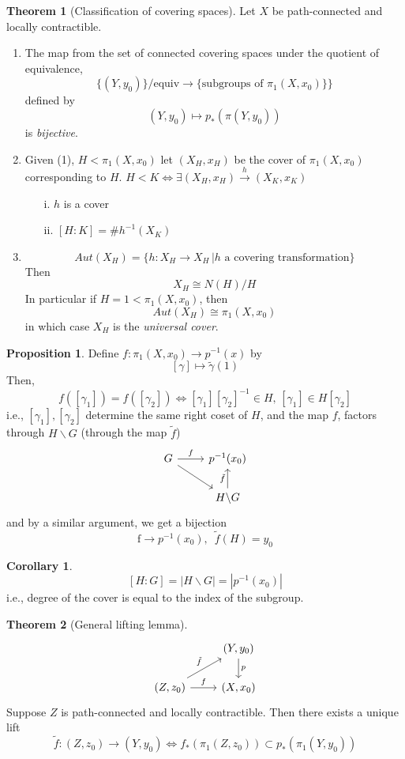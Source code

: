 \documentclass[a4paper,14pt]{extarticle}
\theoremstyle{definition}
\newtheorem*{theorem}{Theorem}
\newtheorem*{corollary}{Corollary}
\newtheorem*{proposition}{Proposition}
\begin{document}
\begin{theorem}[Classification of covering spaces]
  Let $X$ be path-connected and locally contractible.
  \begin{enumerate}
    \item The map from the set of connected covering spaces under the quotient of equivalence,
    \[\{(Y,y_0)\}/\text{equiv}\rightarrow\{\text{subgroups of }\pi_1(X,x_0)\}\}\] defined by
    \[(Y,y_0)\mapsto p_*(\pi(Y,y_0))\] is \textit{bijective}.
    \item Given (1), $H<\pi_1(X,x_0)$ let $(X_H,x_H)$ be the 
    cover of $\pi_1(X,x_0)$ corresponding to $H$. $H<K\iff\exists(X_H,x_H)\xrightarrow{h}
    (X_K,x_K)$
    \begin{enumerate}
      \item[i.] $h$ is a cover
      \item[ii.] $[H:K]=\#h^{-1}(X_K)$
    \end{enumerate}
    \item \[Aut(X_H)=\{h:X_H\rightarrow X_H\,|h\text{ a covering transformation}\}\] Then
    \[X_H\cong N(H)/H\] In particular if $H=1<\pi_1(X,x_0)$, then
    \[Aut(X_H)\cong\pi_1(X,x_0)\] in which case $X_H$ is the \textit{universal cover}.
  \end{enumerate}
\end{theorem}

\begin{proposition}
  Define $f:\pi_1(X,x_0)\rightarrow p^{-1}(x)$ by \[[\gamma]\mapsto\tilde{\gamma}(1)\] Then,
  \[f([\gamma_1])=f([\gamma_2])\iff [\gamma_1][\gamma_2]^{-1}\in H, \,[\gamma_1]\in H[\gamma_2]
  \] i.e., $[\gamma_1],[\gamma_2]$ determine the same right coset of $H$, and the map 
  $f$, factors through $H\backslash G$ (through the map $\tilde{f}$)
  \[
  \begin{tikzcd}
    G \arrow{r}{f} \arrow[swap]{dr}{} & p^{-1}(x_0) \\
     & H\backslash G \arrow{u}{\tilde{f}}
  \end{tikzcd}
\]
and by a similar argument, we get a bijection 
\[\text{f}\rightarrow p^{-1}(x_0), \,\,\,\tilde{f}(H)=y_0\]
\end{proposition}

\begin{corollary}
  \[[H:G]=|H\backslash G|=|p^{-1}(x_0)|\] i.e., degree of the cover is equal to the index 
  of the subgroup.
\end{corollary}

\begin{theorem}[General lifting lemma]
  \[
  \begin{tikzcd}
    & (Y,y_0) \arrow{d}{p}  \\
    (Z,z_0) \arrow{r}{f} \arrow{ur}{\tilde{f}}  &  (X,x_0)
  \end{tikzcd}
\]
Suppose $Z$ is path-connected and locally contractible. Then there exists a unique lift 
\[\tilde{f}:(Z,z_0)\rightarrow(Y,y_0)\iff f_*(\pi_1(Z,z_0))\subset p_*(\pi_1(Y,y_0))\]
\end{theorem}
\end{document}
